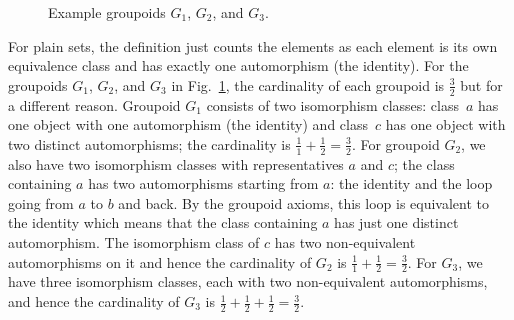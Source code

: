 \begin{figure}[t]
\begin{center}
\qquad
{}
\qquad
{}
\end{center}
\caption{\label{fig:groupoids2}Example groupoids $G_1$, $G_2$, and $G_3$.}
\end{figure}

For plain sets, the definition just counts the elements as each
element is its own equivalence class and has exactly one automorphism
(the identity). For the groupoids $G_1$, $G_2$, and $G_3$ in
Fig.~\ref{fig:groupoids2}, the cardinality of each groupoid is
$\frac{3}{2}$ but for a different reason. Groupoid $G_1$ consists of
two isomorphism classes: class~$a$ has one object with one
automorphism (the identity) and class~$c$ has one object with two
distinct automorphisms; the cardinality is
$\frac{1}{1} + \frac{1}{2} = \frac{3}{2}$. For groupoid $G_2$, we also
have two isomorphism classes with representatives $a$ and $c$; the
class containing $a$ has two automorphisms starting from $a$: the
identity and the loop going from $a$ to $b$ and back. By the groupoid
axioms, this loop is equivalent to the identity which means that the
class containing $a$ has just one distinct automorphism. The
isomorphism class of $c$ has two non-equivalent automorphisms on it
and hence the cardinality of $G_2$ is
$\frac{1}{1} + \frac{1}{2} = \frac{3}{2}$. For $G_3$, we have three
isomorphism classes, each with two non-equivalent automorphisms, and
hence the cardinality of $G_3$ is
$\frac{1}{2} + \frac{1}{2} + \frac{1}{2} = \frac{3}{2}$.

